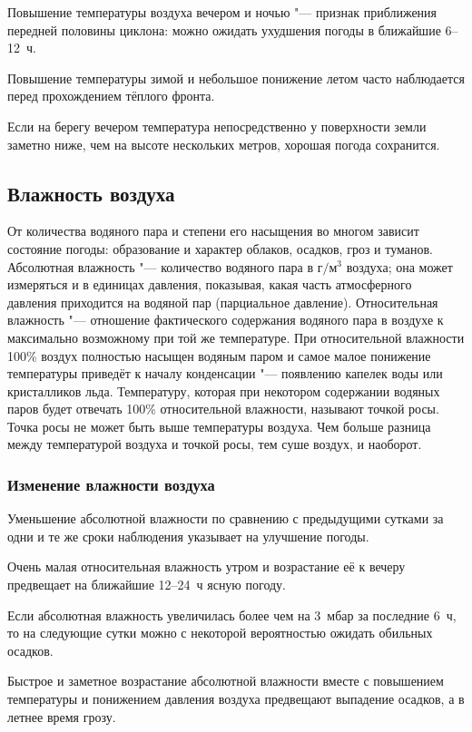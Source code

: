  Повышение температуры воздуха вечером и ночью "--- признак
приближения передней половины циклона: можно ожидать ухудшения погоды
в ближайшие 6--12~ч.

 Повышение температуры зимой и небольшое понижение летом часто
наблюдается перед прохождением тёплого фронта.

 Если на берегу вечером температура непосредственно у
поверхности земли заметно ниже, чем на высоте нескольких метров,
хорошая погода сохранится.

\subsection{Влажность воздуха}

От количества водяного пара и степени его насыщения во многом зависит
состояние погоды: образование и характер облаков, осадков, гроз и
туманов. Абсолютная влажность "--- количество водяного пара в г$/$м$^3$
воздуха; она может измеряться и в единицах давления, показывая, какая
часть атмосферного давления приходится на водяной пар (парциальное
давление). Относительная влажность "--- отношение фактического содержания
водяного пара в воздухе к максимально возможному при той же
температуре. При относительной влажности 100\% воздух полностью
насыщен водяным паром и самое малое понижение температуры приведёт к
началу конденсации "--- появлению капелек воды или кристалликов
льда. Температуру, которая при некотором содержании водяных паров
будет отвечать 100\% относительной влажности, называют точкой
росы. Точка росы не может быть выше температуры воздуха. Чем больше
разница между температурой воздуха и точкой росы, тем суше воздух, и
наоборот.

\subsubsection{Изменение влажности воздуха}

 Уменьшение абсолютной влажности по сравнению с предыдущими
сутками за одни и те же сроки наблюдения указывает на улучшение
погоды.

 Очень малая относительная влажность утром и возрастание её к
вечеру предвещает на ближайшие 12--24~ч ясную погоду.

 Если абсолютная влажность увеличилась более чем на 3~мбар за
последние 6~ч, то на следующие сутки можно с некоторой вероятностью
ожидать обильных осадков.

 Быстрое и заметное возрастание абсолютной влажности вместе с
повышением температуры и понижением давления воздуха предвещают
выпадение осадков, а в летнее время грозу.

